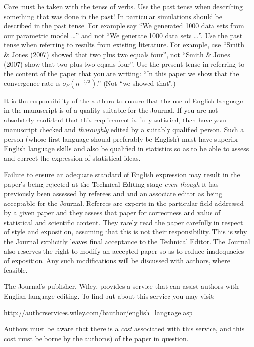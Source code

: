 \documentclass[
doublespace,
  times]{anzsauth}
\begin{document}
Care must be taken with the tense of verbs. Use the past tense when
describing something that was done in the past! In particular
simulations should be described in the past tense. For example say ``We
generated 1000 data sets from our parametric model \ldots'' and not ``We
generate 1000 data sets \ldots''. Use the past tense when referring to
results from existing literature. For example, use ``Smith \& Jones
(2007) showed that two plus two equals four'', not ``Smith \& Jones
(2007) show that two plus two equals four''. Use the present tense in
referring to the content of the paper that you are writing: ``In this
paper we show that the convergence rate is \(o_P(n^{-2/3})\).'' (Not
``we showed that''.)

It is the responsibility of the authors to ensure that the use of
English language in the manuscript is of a quality suitable for the
Journal. If you are not absolutely confident that this requirement is
fully satisfied, then have your manuscript checked and \emph{thoroughly}
edited by a suitably qualified person. Such a person (whose first
language should preferably be English) must have superior English
language skills and also be qualified in statistics so as to be able to
assess and correct the expression of statistical ideas.

Failure to ensure an adequate standard of English expression may result
in the paper's being rejected at the Technical Editing stage \emph{even
though} it has previously been assessed by referees and and an associate
editor as being acceptable for the Journal. Referees are experts in the
particular field addressed by a given paper and they assess that paper
for correctness and value of statistical and scientific content. They
rarely read the paper carefully in respect of style and exposition,
assuming that this is not their responsibility. This is why the Journal
explicitly leaves final acceptance to the Technical Editor. The Journal
also reserves the right to modify an accepted paper so as to reduce
inadequacies of exposition. Any such modifications will be discussed
with authors, where feasible.

The Journal's publisher, Wiley, provides a service that can assist
authors with English-language editing. To find out about this service
you may visit:

\url{http://authorservices.wiley.com/bauthor/english_language.asp}

Authors must be aware that there is a \emph{cost} associated with this
service, and this cost must be borne by the author(s) of the paper in
question.
\end{document}
